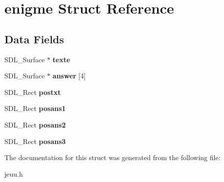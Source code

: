 \hypertarget{structenigme}{}\section{enigme Struct Reference}
\label{structenigme}
\subsection*{Data Fields}
\begin{DoxyCompactItemize}
\item 
S\+D\+L\+\_\+\+Surface $\ast$ {\bfseries texte}\hypertarget{structenigme_a0463e1b04ae7a94fa6884c891c382b4e}{}\label{structenigme_a0463e1b04ae7a94fa6884c891c382b4e}

\item 
S\+D\+L\+\_\+\+Surface $\ast$ {\bfseries answer} \mbox{[}4\mbox{]}\hypertarget{structenigme_a9c787bb1d1cc64b884e895706b21280f}{}\label{structenigme_a9c787bb1d1cc64b884e895706b21280f}

\item 
S\+D\+L\+\_\+\+Rect {\bfseries postxt}\hypertarget{structenigme_a1f3867d1cbdbd7658628b57823edb9cf}{}\label{structenigme_a1f3867d1cbdbd7658628b57823edb9cf}

\item 
S\+D\+L\+\_\+\+Rect {\bfseries posans1}\hypertarget{structenigme_abc1a95bc35a368f3d82b2ac3533c5673}{}\label{structenigme_abc1a95bc35a368f3d82b2ac3533c5673}

\item 
S\+D\+L\+\_\+\+Rect {\bfseries posans2}\hypertarget{structenigme_aba30762a1517f13fed3cccbff4617c1a}{}\label{structenigme_aba30762a1517f13fed3cccbff4617c1a}

\item 
S\+D\+L\+\_\+\+Rect {\bfseries posans3}\hypertarget{structenigme_a4c60f06cf2721beea668ef414cac6792}{}\label{structenigme_a4c60f06cf2721beea668ef414cac6792}

\end{DoxyCompactItemize}


The documentation for this struct was generated from the following file\+:\begin{DoxyCompactItemize}
\item 
jeuu.\+h\end{DoxyCompactItemize}
